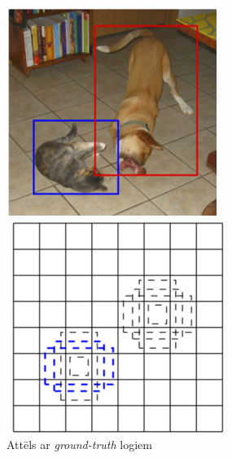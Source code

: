 \begin{figure}[!htb]
	\includegraphics[width=\linewidth]{images/ssdgtboxes.png}
	\caption{Attēls ar \textit{ground-truth} logiem \cite{liu2016ssd}}
	\endminipage\hfill
	\includegraphics[width=\linewidth]{images/ssd88featmap.png}

\end{figure}

